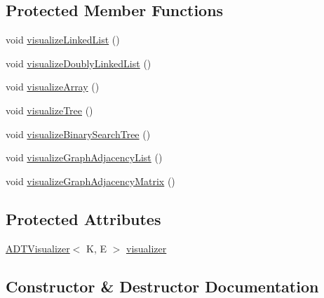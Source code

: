 \subsection*{Protected Member Functions}
\begin{DoxyCompactItemize}
\item 
void \hyperlink{classbridges_1_1connect_1_1_bridges_ae9ce2673d2eef1da7f6e1359c494f6fe}{visualize\+Linked\+List} ()
\item 
void \hyperlink{classbridges_1_1connect_1_1_bridges_ac1ac1db8cf7123aefb83ab05af83375d}{visualize\+Doubly\+Linked\+List} ()
\item 
void \hyperlink{classbridges_1_1connect_1_1_bridges_ac4e90699b288fcfbaf19e59bc4dbafb3}{visualize\+Array} ()
\item 
void \hyperlink{classbridges_1_1connect_1_1_bridges_abd8fa1ef8d6c5d3e6c533ee069d24d85}{visualize\+Tree} ()
\item 
void \hyperlink{classbridges_1_1connect_1_1_bridges_a283d29561d78a890f01c8735c18d17d0}{visualize\+Binary\+Search\+Tree} ()
\item 
void \hyperlink{classbridges_1_1connect_1_1_bridges_a7470f7a358eee6a6cded3ab42f8b9cdc}{visualize\+Graph\+Adjacency\+List} ()
\item 
void \hyperlink{classbridges_1_1connect_1_1_bridges_a13c154c2a656dd4c19f2ff0e767f63c3}{visualize\+Graph\+Adjacency\+Matrix} ()
\end{DoxyCompactItemize}
\subsection*{Protected Attributes}
\begin{DoxyCompactItemize}
\item 
\hyperlink{classbridges_1_1base_1_1_a_d_t_visualizer}{A\+D\+T\+Visualizer}$<$ K, E $>$ \hyperlink{classbridges_1_1connect_1_1_bridges_af3fc35779b31c976ed8bf2e173310502}{visualizer}
\end{DoxyCompactItemize}


\subsection{Constructor \& Destructor Documentation}
\hypertarget{classbridges_1_1connect_1_1_bridges_a4925cf146eff9ff84e89351ab574795d}{}

